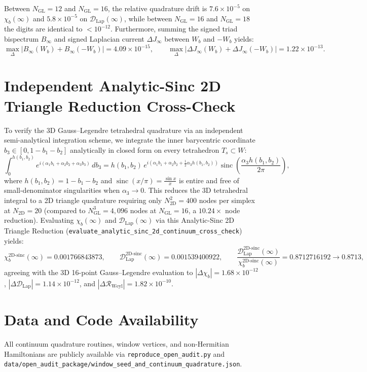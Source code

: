 \documentclass[11pt,a4paper]{article}
\begin{document}
Between $N_{\mathrm{GL}} = 12$ and $N_{\mathrm{GL}} = 16$, the relative quadrature drift is $7.6\times 10^{-5}$ on $\chi_b(\infty)$ and $5.8\times 10^{-5}$ on $\mathcal{D}_{\mathrm{Lap}}(\infty)$, while between $N_{\mathrm{GL}} = 16$ and $N_{\mathrm{GL}} = 18$ the digits are identical to $< 10^{-12}$. Furthermore, summing the signed triad bispectrum $B_\infty$ and signed Laplacian current $\Delta J_\infty$ between $W_b$ and $-W_b$ yields:
\begin{equation}
\max_{\Delta} \big|B_\infty(W_b) + B_\infty(-W_b)\big| = 4.09\times 10^{-15}, \qquad \max_{\Delta} \big|\Delta J_\infty(W_b) + \Delta J_\infty(-W_b)\big| = 1.22\times 10^{-13}.
\end{equation}

\section{Independent Analytic-Sinc 2D Triangle Reduction Cross-Check}

To verify the 3D Gauss--Legendre tetrahedral quadrature via an independent semi-analytical integration scheme, we integrate the inner barycentric coordinate $b_3 \in [0, 1 - b_1 - b_2]$ analytically in closed form on every tetrahedron $T_s \subset W$:
\begin{equation}
\int_0^{h(b_1,b_2)} e^{i(\alpha_1 b_1 + \alpha_2 b_2 + \alpha_3 b_3)}\, db_3 = h(b_1,b_2)\, e^{i\left(\alpha_1 b_1 + \alpha_2 b_2 + \frac{1}{2}\alpha_3 h(b_1,b_2)\right)} \operatorname{sinc}\!\left(\frac{\alpha_3 h(b_1,b_2)}{2\pi}\right),
\end{equation}
where $h(b_1,b_2) = 1 - b_1 - b_2$ and $\operatorname{sinc}(x/\pi) = \frac{\sin x}{x}$ is entire and free of small-denominator singularities when $\alpha_3 \to 0$. This reduces the 3D tetrahedral integral to a 2D triangle quadrature requiring only $N_{2\mathrm{D}}^2 = 400$ nodes per simplex at $N_{2\mathrm{D}} = 20$ (compared to $N_{\mathrm{GL}}^3 = 4{,}096$ nodes at $N_{\mathrm{GL}} = 16$, a $10.24\times$ node reduction). Evaluating $\chi_b(\infty)$ and $\mathcal{D}_{\mathrm{Lap}}(\infty)$ via this Analytic-Sinc 2D Triangle Reduction (\texttt{evaluate\_analytic\_sinc\_2d\_continuum\_cross\_check}) yields:
\begin{equation}
\chi_b^{\text{2D-sinc}}(\infty) = 0.001766843873, \qquad \mathcal{D}_{\mathrm{Lap}}^{\text{2D-sinc}}(\infty) = 0.001539400922, \qquad \frac{\mathcal{D}_{\mathrm{Lap}}^{\text{2D-sinc}}(\infty)}{\chi_b^{\text{2D-sinc}}(\infty)} = 0.8712716192 \to \mathbf{0.8713},
\end{equation}
agreeing with the 3D 16-point Gauss--Legendre evaluation to $|\Delta\chi_b| = 1.68\times 10^{-12}$, $|\Delta\mathcal{D}_{\mathrm{Lap}}| = 1.14\times 10^{-12}$, and $|\Delta\mathcal{R}_{\mathrm{Weyl}}| = 1.82\times 10^{-10}$.

\section*{Data and Code Availability}
All continuum quadrature routines, window vertices, and non-Hermitian Hamiltonians are publicly available via \texttt{reproduce\_open\_audit.py} and \texttt{data/open\_audit\_package/window\_seed\_and\_continuum\_quadrature.json}.
\end{document}
